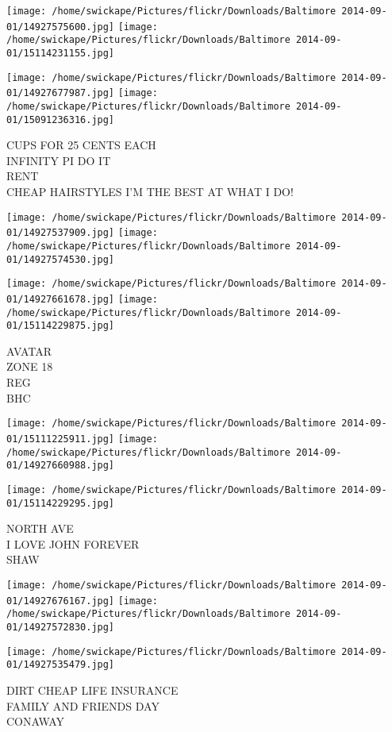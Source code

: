 \documentclass[10pt,letterpaper]{article}
\begin{document}
\texttt{[image: /home/swickape/Pictures/flickr/Downloads/Baltimore 2014-09-01/14927575600.jpg]}
\texttt{[image: /home/swickape/Pictures/flickr/Downloads/Baltimore 2014-09-01/15114231155.jpg]}

\texttt{[image: /home/swickape/Pictures/flickr/Downloads/Baltimore 2014-09-01/14927677987.jpg]}
\texttt{[image: /home/swickape/Pictures/flickr/Downloads/Baltimore 2014-09-01/15091236316.jpg]}

CUPS FOR 25 CENTS EACH\\
INFINITY PI DO IT\\
RENT\\
CHEAP HAIRSTYLES I'M THE BEST AT WHAT I DO!
\pagebreak

\texttt{[image: /home/swickape/Pictures/flickr/Downloads/Baltimore 2014-09-01/14927537909.jpg]}
\texttt{[image: /home/swickape/Pictures/flickr/Downloads/Baltimore 2014-09-01/14927574530.jpg]}

\texttt{[image: /home/swickape/Pictures/flickr/Downloads/Baltimore 2014-09-01/14927661678.jpg]}
\texttt{[image: /home/swickape/Pictures/flickr/Downloads/Baltimore 2014-09-01/15114229875.jpg]}

AVATAR\\
ZONE 18\\
REG\\
BHC
\pagebreak

\texttt{[image: /home/swickape/Pictures/flickr/Downloads/Baltimore 2014-09-01/15111225911.jpg]}
\texttt{[image: /home/swickape/Pictures/flickr/Downloads/Baltimore 2014-09-01/14927660988.jpg]}

\vspace{0.25in}
\texttt{[image: /home/swickape/Pictures/flickr/Downloads/Baltimore 2014-09-01/15114229295.jpg]}

NORTH AVE\\
I LOVE JOHN FOREVER\\
SHAW
\pagebreak

\texttt{[image: /home/swickape/Pictures/flickr/Downloads/Baltimore 2014-09-01/14927676167.jpg]}
\texttt{[image: /home/swickape/Pictures/flickr/Downloads/Baltimore 2014-09-01/14927572830.jpg]}

\texttt{[image: /home/swickape/Pictures/flickr/Downloads/Baltimore 2014-09-01/14927535479.jpg]}

DIRT CHEAP LIFE INSURANCE\\
FAMILY AND FRIENDS DAY\\
CONAWAY
\pagebreak
\end{document}
